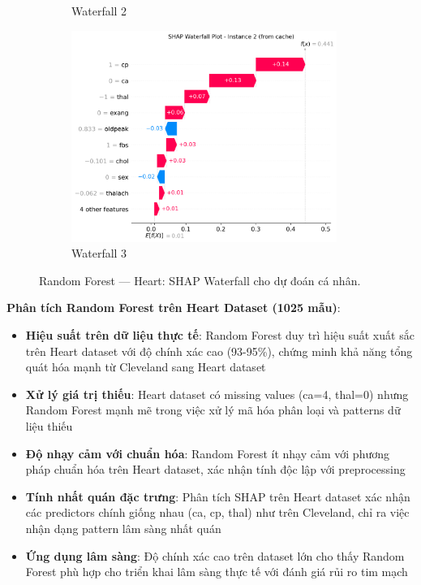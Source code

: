 \begin{figure}[H]
\begin{subfigure}[b]{0.31\textwidth}
\caption{Waterfall 2}
\label{fig:rf_heart_waterfall2}
\end{subfigure}\hfill
\begin{subfigure}[b]{0.31\textwidth}
\centering
\includegraphics[width=0.95\textwidth]{Result/heart_dataset/RF/SHAP/Waterfall 3.png}
\caption{Waterfall 3}
\label{fig:rf_heart_waterfall3}
\end{subfigure}
\caption{Random Forest — Heart: SHAP Waterfall cho dự đoán cá nhân.}
\label{fig:rf_heart_waterfalls}
\end{figure}

\textbf{Phân tích Random Forest trên Heart Dataset (1025 mẫu)}:
\begin{itemize}[leftmargin=*]
    \item \textbf{Hiệu suất trên dữ liệu thực tế}: Random Forest duy trì hiệu suất xuất sắc trên Heart dataset với độ chính xác cao (93-95\%), chứng minh khả năng tổng quát hóa mạnh từ Cleveland sang Heart dataset
    \item \textbf{Xử lý giá trị thiếu}: Heart dataset có missing values (ca=4, thal=0) nhưng Random Forest mạnh mẽ trong việc xử lý mã hóa phân loại và patterns dữ liệu thiếu
    \item \textbf{Độ nhạy cảm với chuẩn hóa}: Random Forest ít nhạy cảm với phương pháp chuẩn hóa trên Heart dataset, xác nhận tính độc lập với preprocessing
    \item \textbf{Tính nhất quán đặc trưng}: Phân tích SHAP trên Heart dataset xác nhận các predictors chính giống nhau (ca, cp, thal) như trên Cleveland, chỉ ra việc nhận dạng pattern lâm sàng nhất quán
    \item \textbf{Ứng dụng lâm sàng}: Độ chính xác cao trên dataset lớn cho thấy Random Forest phù hợp cho triển khai lâm sàng thực tế với đánh giá rủi ro tim mạch
\end{itemize}

